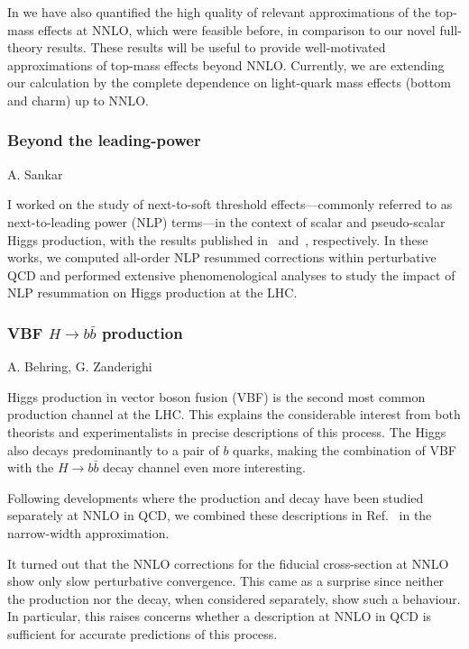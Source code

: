 \documentclass{FBR_Bericht_2025}
\begin{document}
\begin{refsection}
In  we have also quantified the high quality of relevant approximations 
of the top-mass effects at NNLO, which were feasible before, in comparison to our 
novel full-theory results. These results will be useful to provide well-motivated 
approximations of top-mass effects beyond NNLO. Currently, we are extending 
our \minnlo{} calculation by the complete dependence on light-quark mass 
effects (bottom and charm) up to NNLO.
%
\subsubsection{Beyond the leading-power}
\begin{Namen}
A. Sankar
\end{Namen}
%
I worked on the study of next-to-soft threshold effects—commonly referred to as next-to-leading power (NLP) terms—in the context of scalar and pseudo-scalar Higgs production, with the results published in~\cite{Das:2024pac} and~\cite{Ravindran:2023qae}, respectively. In these works, we computed all-order NLP resummed corrections within perturbative QCD and performed extensive phenomenological analyses to study the impact of NLP resummation on Higgs production at the LHC.
%
\subsubsection{VBF $H\rightarrow b\bar{b}$ production}
\begin{Namen}
A. Behring, G. Zanderighi
\end{Namen}
Higgs production in vector boson fusion (VBF) is the second most common
production channel at the LHC. This explains the considerable interest from
both theorists and experimentalists in precise descriptions of this process.
The Higgs also decays predominantly to a pair of $b$ quarks, making the
combination of VBF with the $H \to b\bar{b}$ decay channel even more
interesting.

Following developments where the production \cite{Asteriadis:2021gpd} and decay
\cite{Behring:2019oci} have been studied separately at NNLO in QCD, we combined
these descriptions in Ref.~\cite{Asteriadis:2024nbg} in the narrow-width
approximation.

It turned out that the NNLO corrections for the fiducial cross-section at NNLO
show only slow perturbative convergence. This came as a surprise since neither
the production nor the decay, when considered separately, show such a
behaviour. In particular, this raises concerns whether a description at NNLO in
QCD is sufficient for accurate predictions of this process.


\end{refsection}
\end{document}
